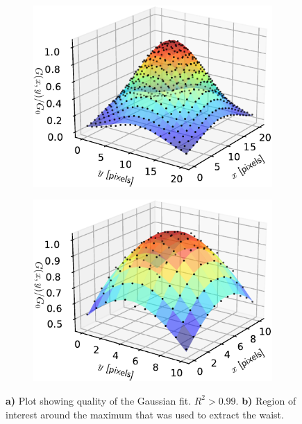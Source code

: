 \begin{figure}
\centering
	\begin{subfigure}{.49\textwidth}
	    \centering
		\includegraphics[width=0.96\linewidth]{figures/3DSpotFitGaussian.pdf}
		\caption{}
		\label{fig:3Dshowing}
	\end{subfigure}
	\begin{subfigure}{.49\textwidth}
		\centering
		\includegraphics[width=0.96\linewidth]{figures/3DSpotFitGaussianSmaller.pdf}
		\caption{}
		\label{fig:3Dwaistfit}
	\end{subfigure}
	\caption{\textbf{a)} Plot showing quality of the Gaussian fit. $R^2 > 0.99$.
	\textbf{ b)} Region of interest around the maximum that was used to extract the waist.}
	\label{fig:3Dfits}
\end{figure}

